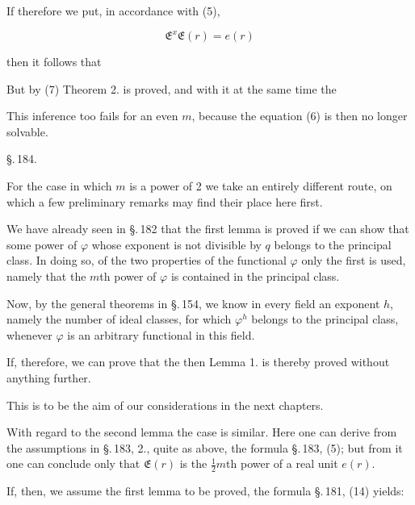 If therefore we put, in accordance with (5),

\[
\mathfrak{E}^x \mathfrak{E}(r) = e(r)
\]

then it follows that


But by (7) Theorem 2. is proved, and with it at the same time the

This inference too fails for an even $m$, because the equation (6) is
then no longer solvable.

\begin{center}
\S.\,184.

\end{center}

For the case in which $m$ is a power of 2 we take an entirely
different route, on which a few preliminary remarks may find their
place here first.

We have already seen in \S.\,182 that the first lemma is proved if we
can show that some power of $\varphi$ whose exponent is not divisible
by $q$ belongs to the principal class. In doing so, of the two
properties of the functional $\varphi$ only the first is used, namely
that the $m$th power of $\varphi$ is contained in the principal
class.

Now, by the general theorems in \S.\,154, we know in every field an
exponent $h$, namely the number of ideal classes, for which
$\varphi^h$ belongs to the principal class, whenever $\varphi$ is an
arbitrary functional in this field.

If, therefore, we can prove that the  then Lemma 1.
is thereby proved without anything further.

This is to be the aim of our considerations in the next chapters.

With regard to the second lemma the case is similar. Here one can
derive from the assumptions in \S.\,183, 2., quite as above, the
formula \S.\,183, (5); but from it one can conclude only that
$\mathfrak{E}(r)$ is the $\frac{1}{2} m$th power of a real unit
$e(r)$.

If, then, we assume the first lemma to be proved, the formula
\S.\,181, (14) yields:

